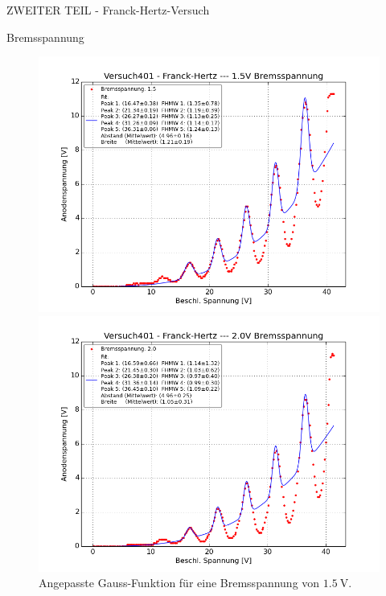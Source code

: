 \begin{appendix}
\begin{chapter}{ZWEITER TEIL - Franck-Hertz-Versuch}
\begin{section}{Bremsspannung}
      
      \newpage
      \begin{figure}[ht]
        \centering
        \begin{minipage}{0.48\textwidth}
          \centering
          \includegraphics[width=\textwidth]
              {Figures/Versuch401-Franck-Hertz-1_5VBremsspannung_Beschl_Spannung_Anodenspannung.png}
          \caption{Angepasste Gauss-Funktion für eine Bremsspannung von 
              $\SI{1.5}{\volt}$.}
          \label{fig:AnhangFHB15V}
        \end{minipage} \quad
        \begin{minipage}{0.48\textwidth}
          \centering
          \includegraphics[width=\textwidth]
              {Figures/Versuch401-Franck-Hertz-2_0VBremsspannung_Beschl_Spannung_Anodenspannung.png}

\end{minipage}
\end{figure}
\end{section}
\end{chapter}
\end{appendix}
